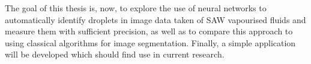 The goal of this thesis is, now, to explore the use of neural networks to automatically identify droplets in image data taken of SAW vapourised fluids and measure them with sufficient precision, as well as to compare this approach to using classical algorithms for image segmentation. Finally, a simple application will be developed which should find use in current research.